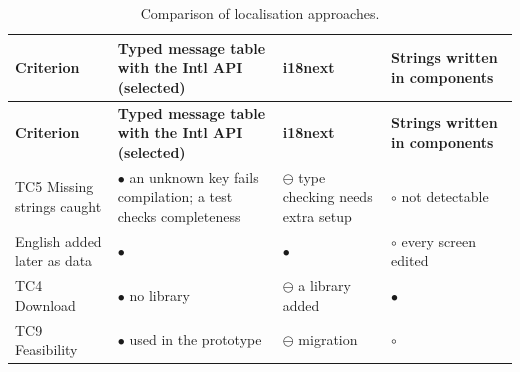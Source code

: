 {\small{}\renewcommand{\arraystretch}{1.1}
\begin{longtable}{|>{\raggedright\arraybackslash}p{}|>{\raggedright\arraybackslash}p{}|>{\raggedright\arraybackslash}p{}|>{\raggedright\arraybackslash}p{}|}
\caption{Comparison of localisation approaches.} \\
\hline
\textbf{Criterion} & \textbf{Typed message table with the Intl API (selected)} & \textbf{i18next\cite{r178}} & \textbf{Strings written in components} \\ \hline
\endfirsthead
\hline
\textbf{Criterion} & \textbf{Typed message table with the Intl API (selected)} & \textbf{i18next\cite{r178}} & \textbf{Strings written in components} \\ \hline
\endhead
TC5 Missing strings caught & $\bullet$ an unknown key fails compilation; a test checks completeness & $\ominus$ type checking needs extra setup & $\circ$ not detectable \\ \hline
English added later as data & $\bullet$ & $\bullet$ & $\circ$ every screen edited \\ \hline
TC4 Download & $\bullet$ no library & $\ominus$ a library added & $\bullet$ \\ \hline
TC9 Feasibility & $\bullet$ used in the prototype & $\ominus$ migration & $\circ$ \\ \hline
\end{longtable}
}

